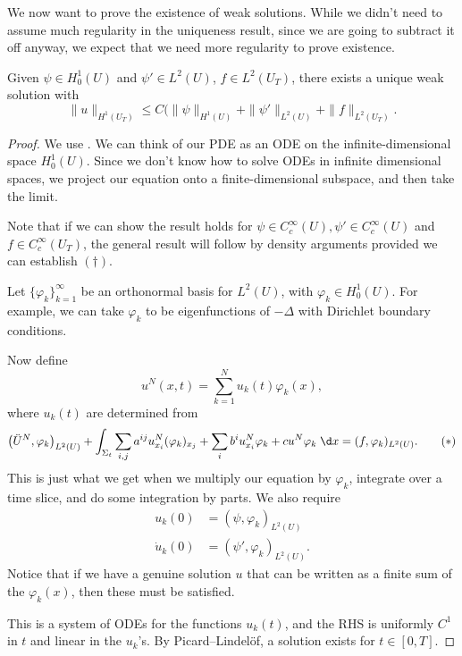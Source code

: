 \documentclass[a4paper]{article}
\begin{document}
We now want to prove the existence of weak solutions. While we didn't need to assume much regularity in the uniqueness result, since we are going to subtract it off anyway, we expect that we need more regularity to prove existence.
\begin{thm}
  Given $\psi \in H_0^1(U)$ and $\psi' \in L^2(U)$, $f \in L^2(U_T)$, there exists a unique weak solution with
  \[
    \|u\|_{H^1(U_T)} \leq C (\|\psi\|_{H^1(U)} + \|\psi'\|_{L^2(U)} + \|f\|_{L^2(U_T)}.\tag{$\dagger$}
  \]
\end{thm}
\begin{proof}
  We use . We can think of our PDE as an ODE on the infinite-dimensional space $H^1_0(U)$. Since we don't know how to solve ODEs in infinite dimensional spaces, we project our equation onto a finite-dimensional subspace, and then take the limit.

  Note that if we can show the result holds for $\psi \in C_c^\infty(U), \psi' \in C_c^\infty(U)$ and $f \in C_c^\infty(U_T)$, the general result will follow by density arguments provided we can establish $(\dagger)$.

  Let $\{\varphi_k\}_{k = 1}^\infty$ be an orthonormal basis for $L^2(U)$, with $\varphi_k \in H_0^1(U)$. For example, we can take $\varphi_k$ to be eigenfunctions of $-\Delta$ with Dirichlet boundary conditions.

  Now define
  \[
    u^N(x, t) = \sum_{k = 1}^N u_k(t) \varphi_k(x),
  \]
  where $u_k(t)$ are determined from
  \[
    \left(\ddot{U}^N, \varphi_k\right)_{L^2(U)} + \int_{\Sigma_t} \sum_{i, j} a^{ij} u_{x_i}^N (\varphi_k)_{x_j} + \sum_i b^i u_{x_i}^N \varphi_k + c u^N \varphi_k \;\d x = (f, \varphi_k)_{L^2(U)}.\tag{$*$}
  \]
  This is just what we get when we multiply our equation by $\varphi_k$, integrate over a time slice, and do some integration by parts. We also require
  \begin{align*}
    u_k(0) &= (\psi, \varphi_k)_{L^2(U)}\\
    \dot{u}_k(0) &= (\psi', \varphi_k)_{L^2(U)}.
  \end{align*}
  Notice that if we have a genuine solution $u$ that can be written as a finite sum of the $\varphi_k(x)$, then these must be satisfied.

  This is a system of ODEs for the functions $u_k(t)$, and the RHS is uniformly $C^1$ in $t$ and linear in the $u_k$'s. By Picard--Lindel\"of, a solution exists for $t \in [0, T]$.


\end{proof}
\end{document}

